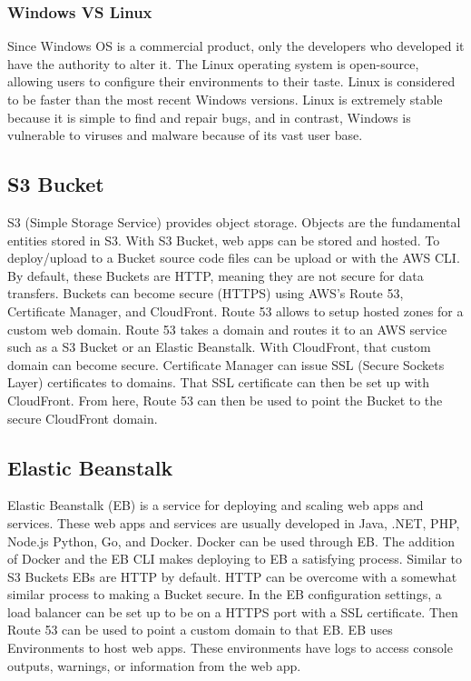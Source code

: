 \subsubsection{Windows VS Linux}
Since Windows OS is a commercial product, only the developers who developed it have the authority to alter it. The Linux operating system is open-source, allowing users to configure their environments to their taste. Linux is considered to be faster than the most recent Windows versions. Linux is extremely stable because it is simple to find and repair bugs, and in contrast, Windows is vulnerable to viruses and malware because of its vast user base. \cite{ref14}

\subsection{S3 Bucket}
S3 (Simple Storage Service) provides object storage. Objects are the fundamental entities stored in S3. With S3 Bucket, web apps can be stored and hosted. To deploy/upload to a Bucket source code files can be upload or with the AWS CLI. By default, these Buckets are HTTP, meaning they are not secure for data transfers. Buckets can become secure (HTTPS) using AWS's Route 53, Certificate Manager, and CloudFront. Route 53 allows to setup hosted zones for a custom web domain. Route 53 takes a domain and routes it to an AWS service such as a S3 Bucket or an Elastic Beanstalk. With CloudFront, that custom domain can become secure. Certificate Manager can issue SSL (Secure Sockets Layer) certificates to domains. That SSL certificate can then be set up with CloudFront. From here, Route 53 can then be used to point the Bucket to the secure CloudFront domain.

\subsection{Elastic Beanstalk}
Elastic Beanstalk (EB) is a service for deploying and scaling web apps and services. These web apps and services are usually developed in Java, .NET, PHP, Node.js Python, Go, and Docker. Docker can be used through EB. The addition of Docker and the EB CLI makes deploying to EB a satisfying process. Similar to S3 Buckets EBs are HTTP by default. HTTP can be overcome with a somewhat similar process to making a Bucket secure. In the EB configuration settings, a load balancer can be set up to be on a HTTPS port with a SSL certificate. Then Route 53 can be used to point a custom domain to that EB. EB uses Environments to host web apps. These environments have logs to access console outputs, warnings, or information from the web app.

